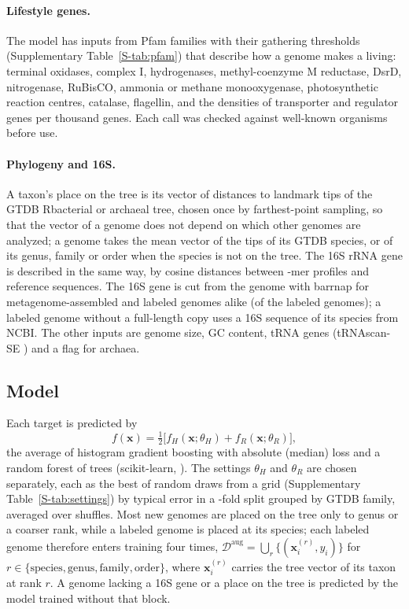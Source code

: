 \paragraph{Lifestyle genes.} The model has \NLifestyleFeatures inputs from \NLifestyleFamilies Pfam families with their
gathering thresholds (Supplementary Table~\ref{S-tab:pfam}) that describe how a genome makes a living: terminal oxidases, complex I,
hydrogenases, methyl-coenzyme M reductase, DsrD, nitrogenase, RuBisCO, ammonia or methane monooxygenase, photosynthetic
reaction centres, catalase, flagellin, and the densities of transporter and regulator genes per thousand genes. Each call
was checked against well-known organisms before use.

\paragraph{Phylogeny and 16S.} A taxon's place on the tree is its vector of distances to \NLandmarks landmark tips of the
GTDB R\GTDBRelease bacterial or archaeal tree, chosen once by farthest-point sampling, so that the vector of a genome does
not depend on which other genomes are analyzed; a genome takes the mean vector of the tips of its GTDB species, or of its
genus, family or order when the species is not on the tree. The 16S rRNA gene is described in the same way, by cosine
distances between \KmerK-mer profiles and \NLandmarks reference sequences. The 16S gene is cut from the genome with barrnap
\citep{barrnap} for metagenome-assembled and labeled genomes alike (\SixteenNGenomeCopy of the \NGenomes labeled genomes);
a labeled genome without a full-length copy uses a 16S sequence of its species from NCBI. The other inputs are genome size,
GC content, tRNA genes (tRNAscan-SE \citep{chan2021}) and a flag for archaea.

\subsection{Model}
Each target is predicted by
\begin{equation}
f(\mathbf{x})=\tfrac12\big[f_{H}(\mathbf{x};\theta_H)+f_{R}(\mathbf{x};\theta_R)\big],
\end{equation}
the average of histogram gradient boosting with absolute (median) loss \citep{friedman2001} and a random forest of
\NForestTrees trees \citep{breiman2001} (scikit-learn, \citealp{pedregosa2011}). The settings $\theta_H$ and $\theta_R$
are chosen separately, each as the best of \NTuneCandidates random draws from a grid (Supplementary
Table~\ref{S-tab:settings}) by typical error in a \NTuneFolds-fold split grouped by GTDB family, averaged over
\NTuneShuffles shuffles. Most new genomes are placed on the tree only to genus or a coarser rank, while a labeled genome is
placed at its species; each labeled genome therefore enters training four times,
$\mathcal{D}^{\mathrm{aug}}=\bigcup_{r}\{(\mathbf{x}^{(r)}_i,y_i)\}$ for $r\in\{\text{species},\text{genus},\text{family},\text{order}\}$,
where $\mathbf{x}^{(r)}_i$ carries the tree vector of its taxon at rank $r$. A genome lacking a 16S gene or a place on the
tree is predicted by the model trained without that block.

